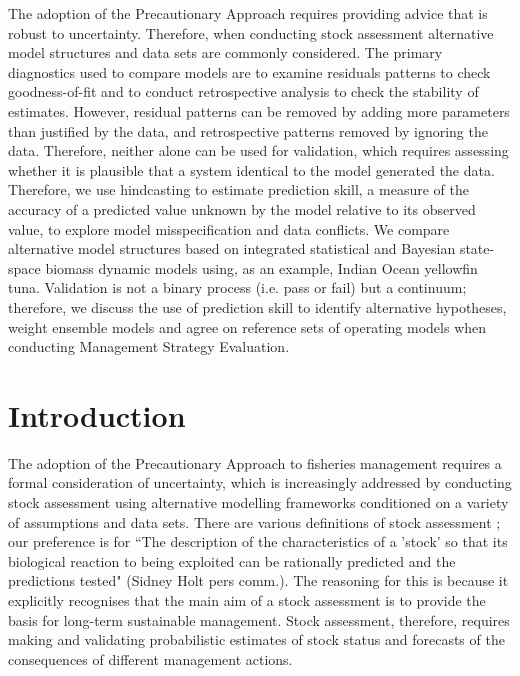 \documentclass[11pt,a4paper]{article}
\begin{document}
{{  The adoption of the Precautionary Approach requires providing advice that is robust to uncertainty. Therefore, when conducting stock assessment alternative model structures and data sets are commonly considered. The primary diagnostics used to compare models are to examine residuals patterns to check goodness-of-fit and to conduct retrospective analysis to check the stability of estimates. However, residual patterns can be removed by adding more parameters than justified by the data,  and retrospective patterns removed by ignoring the data. Therefore, neither alone can be used for validation, which requires assessing whether it is plausible that a system identical to the model generated the data. Therefore, we use hindcasting to estimate prediction skill, a measure of the accuracy of a predicted value unknown by the model relative to its observed value, to explore model misspecification and data conflicts. We compare alternative model structures based on integrated statistical and Bayesian state-space biomass dynamic models using, as an example, Indian Ocean yellowfin tuna.  Validation is not a binary process (i.e. pass or fail) but a continuum; therefore, we discuss the use of prediction skill to identify alternative hypotheses, weight ensemble models  and agree on reference sets of operating models when conducting Management Strategy Evaluation.}
  
\newpage
\section{Introduction}

The adoption of the Precautionary Approach to fisheries management \citep[PA,][]{garcia1996precautionary} requires a formal consideration of uncertainty, which is increasingly addressed by conducting stock assessment using alternative modelling frameworks conditioned on a variety of assumptions and data sets. There are various definitions of stock assessment \citep[e.g.][]{hilborn2003state,cadrin2014stock}; our preference is for ``The description of the characteristics of a 'stock' so that its biological reaction to being exploited can be rationally predicted and the predictions tested" (Sidney Holt pers comm.). The reasoning for this is because it explicitly recognises that the main aim of a stock assessment is to provide the basis for long-term sustainable management.  Stock assessment, therefore, requires making and validating probabilistic estimates of stock status and forecasts of the consequences of different management actions. 

}
\end{document}
